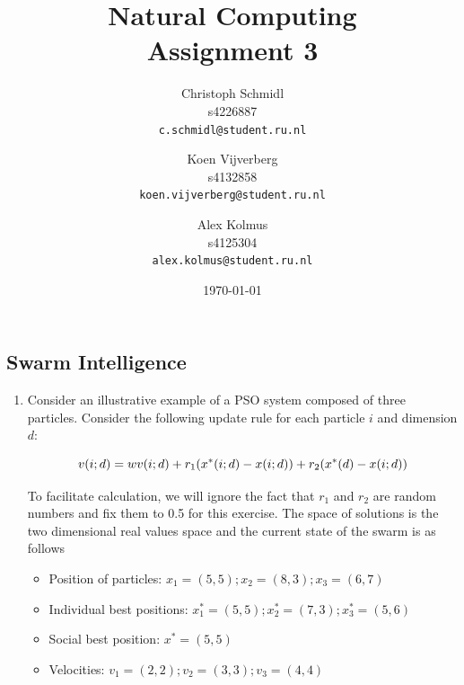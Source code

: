 \documentclass[a4paper]{article}
\title{Natural Computing\\Assignment 3}
\author{
  Christoph Schmidl\\ s4226887\\      \texttt{c.schmidl@student.ru.nl}
  \and
  Koen Vijverberg\\ s4132858\\     \texttt{koen.vijverberg@student.ru.nl}
  \and
  Alex Kolmus\\	s4125304\\	\texttt{alex.kolmus@student.ru.nl}
}
\date{\today}
\begin{document}
\maketitle


\subsection*{Swarm Intelligence}

\begin{enumerate}

	\item Consider an illustrative example of a PSO system composed of three particles. Consider the following update rule for each particle $i$ and dimension $d$:
	
	\begin{equation}
		v(i;d) = wv(i;d) + r_1(x^*(i;d) - x(i;d)) + r_2(x^*(d) - x(i;d)) \notag
	\end{equation}

To facilitate calculation, we will ignore the fact that $r_1$ and $r_2$ are random numbers and fix them to 0.5 for this exercise. The space of solutions is the two dimensional real values space and the current state of the swarm is as follows

\begin{itemize}
	\item Position of particles: $x_1 = (5,5); x_2 = (8,3); x_3 = (6,7)$
	\item Individual best positions: $x^*_1 = (5,5); x^*_2 = (7,3); x^*_3 = (5,6)$
	\item Social best position: $x^* = (5,5)$
	\item Velocities: $v_1 = (2,2); v_2 = (3,3); v_3 = (4,4)$
\end{itemize}


\end{enumerate}
\end{document}
